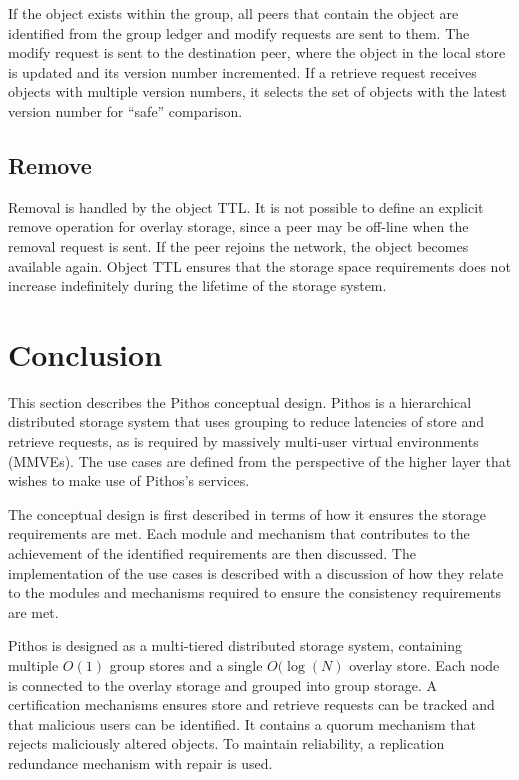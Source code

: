 If the object exists within the group, all peers that contain the object are identified from the group ledger and modify requests are sent to them. The modify request is sent to the destination peer, where the object in the local store is updated and its version number incremented. If a retrieve request receives objects with multiple version numbers, it selects the set of objects with the latest version number for ``safe'' comparison.

\subsection{Remove}

Removal is handled by the object TTL. It is not possible to define an explicit remove operation for overlay storage, since a peer may be off-line when the removal request is sent. If the peer rejoins the network, the object becomes available again. Object TTL ensures that the storage space requirements does not increase indefinitely during the lifetime of the storage system.

\section{Conclusion}

This section describes the Pithos conceptual design. Pithos is a hierarchical distributed storage system that uses grouping to reduce latencies of store and retrieve requests, as is required by massively multi-user virtual environments (MMVEs). The use cases are defined from the perspective of the higher layer that wishes to make use of Pithos's services.

The conceptual design is first described in terms of how it ensures the storage requirements are met. Each module and mechanism that contributes to the achievement of the identified requirements are then discussed. The implementation of the use cases is described with a discussion of how they relate to the modules and mechanisms required to ensure the consistency requirements are met.

Pithos is designed as a multi-tiered distributed storage system, containing multiple $O(1)$ group stores and a single $O(\log(N)$ overlay store. Each node is connected to the overlay storage and grouped into group storage. A certification mechanisms ensures store and retrieve requests can be tracked and that malicious users can be identified. It contains a quorum mechanism that rejects maliciously altered objects. To maintain reliability, a replication redundance mechanism with repair is used.

